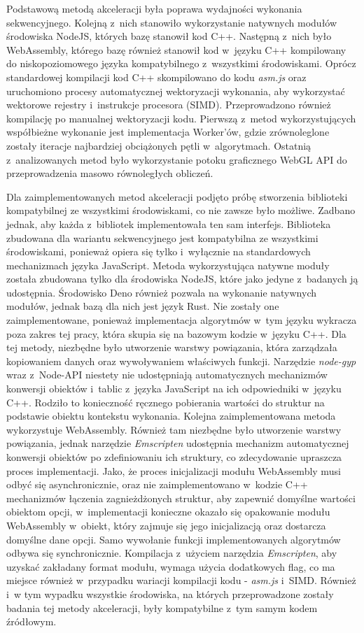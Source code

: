 Podstawową metodą akceleracji była poprawa wydajności wykonania sekwencyjnego. Kolejną z~nich stanowiło wykorzystanie natywnych modułów środowiska NodeJS, których bazę stanowił kod C++. Następną z~nich było WebAssembly, którego bazę również stanowił kod w~języku C++ kompilowany do niskopoziomowego języka kompatybilnego z~wszystkimi środowiskami. Oprócz standardowej kompilacji kod C++ skompilowano do kodu \textit{asm.js} oraz uruchomiono procesy automatycznej wektoryzacji wykonania, aby wykorzystać wektorowe rejestry i~instrukcje procesora (SIMD). Przeprowadzono również kompilację po manualnej wektoryzacji kodu. Pierwszą z~metod wykorzystujących współbieżne wykonanie jest implementacja Worker'ów, gdzie zrównoleglone zostały iteracje najbardziej obciążonych pętli w~algorytmach. Ostatnią z~analizowanych metod było wykorzystanie potoku graficznego WebGL API do przeprowadzenia masowo równoległych obliczeń.

Dla zaimplementowanych metod akceleracji podjęto próbę stworzenia biblioteki kompatybilnej ze wszystkimi środowiskami, co nie zawsze było możliwe. Zadbano jednak, aby każda z~bibliotek implementowała ten sam interfejs. Biblioteka zbudowana dla wariantu sekwencyjnego jest kompatybilna ze wszystkimi środowiskami, ponieważ opiera się tylko i~wyłącznie na standardowych mechanizmach języka JavaScript. Metoda wykorzystująca natywne moduły została zbudowana tylko dla środowiska NodeJS, które jako jedyne z~badanych ją udostępnia. Środowisko Deno również pozwala na wykonanie natywnych modułów, jednak bazą dla nich jest język Rust. Nie zostały one zaimplementowane, ponieważ implementacja algorytmów w~tym języku wykracza poza zakres tej pracy, która skupia się na bazowym kodzie w~języku C++. Dla tej metody, niezbędne było utworzenie warstwy powiązania, która zarządzała kopiowaniem danych oraz wywoływaniem właściwych funkcji. Narzędzie \textit{node-gyp} wraz z~Node-API niestety nie udostępniają automatycznych mechanizmów konwersji obiektów i~tablic z~języka JavaScript na ich odpowiedniki w~języku C++. Rodziło to konieczność ręcznego pobierania wartości do struktur na podstawie obiektu kontekstu wykonania. Kolejna zaimplementowana metoda wykorzystuje WebAssembly. Również tam niezbędne było utworzenie warstwy powiązania, jednak narzędzie \textit{Emscripten} udostępnia mechanizm automatycznej konwersji obiektów po zdefiniowaniu ich struktury, co zdecydowanie upraszcza proces implementacji. Jako, że proces inicjalizacji modułu WebAssembly musi odbyć się asynchronicznie, oraz nie zaimplementowano w~kodzie C++ mechanizmów łączenia zagnieżdżonych struktur, aby zapewnić domyślne wartości obiektom opcji, w~implementacji konieczne okazało się opakowanie modułu WebAssembly w~obiekt, który zajmuje się jego inicjalizacją oraz dostarcza domyślne dane opcji. Samo wywołanie funkcji implementowanych algorytmów odbywa się synchronicznie. Kompilacja z~użyciem narzędzia \textit{Emscripten}, aby uzyskać zakładany format modułu, wymaga użycia dodatkowych flag, co ma miejsce również w~przypadku wariacji kompilacji kodu - \textit{asm.js} i~SIMD. Również i~w tym wypadku wszystkie środowiska, na których przeprowadzone zostały badania tej metody akceleracji, były kompatybilne z~tym samym kodem źródłowym.

